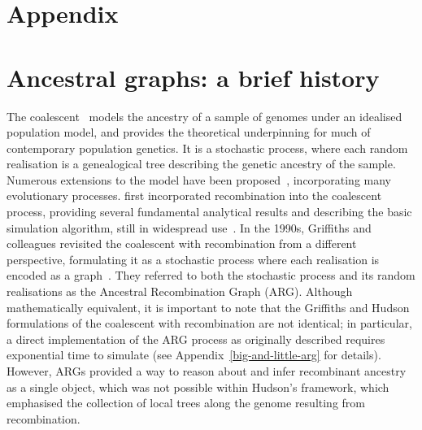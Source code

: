 \documentclass{article}
\begin{document}



\setcounter{secnumdepth}{2} %

\section*{Appendix}
\appendix

\setcounter{table}{0}
\setcounter{figure}{0}
\renewcommand{\thetable}{A\arabic{table}}
\renewcommand{\thefigure}{A\arabic{figure}}

\section{Ancestral graphs: a brief history}
\label{sec-arg-history}
The coalescent~\citep{kingman1982coalescent,kingman1982genealogy,
hudson1983testing, tajima1983evolutionary} models the ancestry of a sample of
genomes under an idealised population model, and provides the theoretical
underpinning for much of contemporary population genetics.
It is a stochastic process, where each random realisation
is a genealogical tree describing the genetic ancestry of the sample.
Numerous extensions to the model have been
proposed~\citep{hudson1990gene,hein2004gene,wakely2008coalescent},
incorporating many evolutionary processes.
\citet{hudson1983properties}
first incorporated recombination into the coalescent process,
providing several fundamental analytical results
and describing the basic simulation algorithm, still in
widespread use~\citep{hudson2002generating,kelleher2016efficient,
baumdicker2021efficient}.
In the 1990s, Griffiths and colleagues revisited the
coalescent with recombination from a different perspective,
formulating it as a stochastic process where each realisation
is encoded as a graph~\citep{griffiths1991two,ethier1990two,
griffiths1996ancestral,griffiths1997ancestral}.
They referred to both the stochastic process and
its random realisations as the Ancestral Recombination Graph (ARG).
Although mathematically equivalent, it is
important to note that the Griffiths and Hudson formulations of
the coalescent with recombination are not identical;
in particular, a direct implementation of the ARG process
as originally described requires exponential time to simulate
(see Appendix~\ref{big-and-little-arg} for details). However, ARGs provided a way
to reason about and infer recombinant ancestry as a single object,
which was not possible within Hudson's framework, which emphasised
the collection of local trees along the genome resulting from recombination.
\end{document}
